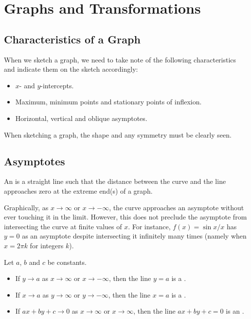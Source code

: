 \chapter{Graphs and Transformations}

\section{Characteristics of a Graph}

When we sketch a graph, we need to take note of the following characteristics and indicate them on the sketch accordingly:
\begin{itemize}
    \item {} $x$- and $y$-intercepts.
    \item {} Maximum, minimum points and stationary points of inflexion.
    \item {} Horizontal, vertical and oblique asymptotes.
\end{itemize}

When sketching a graph, the shape and any symmetry must be clearly seen.

\section{Asymptotes}

\begin{definition}
    An  is a straight line such that the distance between the curve and the line approaches zero at the extreme end(s) of a graph.
\end{definition}

Graphically, as $x \to \infty$ or $x \to -\infty$, the curve approaches an asymptote without ever touching it in the limit. However, this does not preclude the asymptote from intersecting the curve at finite values of $x$. For instance, $f(x) = \sin{x}/x$ has $y = 0$ as an asymptote despite intersecting it infinitely many times (namely when $x = 2\pi k$ for integers $k$).

\begin{definition}
    Let $a$, $b$ and $c$ be constants.

    \begin{itemize}
        \item If $y \to a$ as $x \to \infty$ or $x \to -\infty$, then the line $y = a$ is a .
        \item If $x \to a$ as $y \to \infty$ or $y \to -\infty$, then the line $x = a$ is a .
        \item If $ax + by + c \to 0$ as $x \to \infty$ or $x \to \infty$, then the line $ax + by + c = 0$ is an .
    \end{itemize}
\end{definition}

